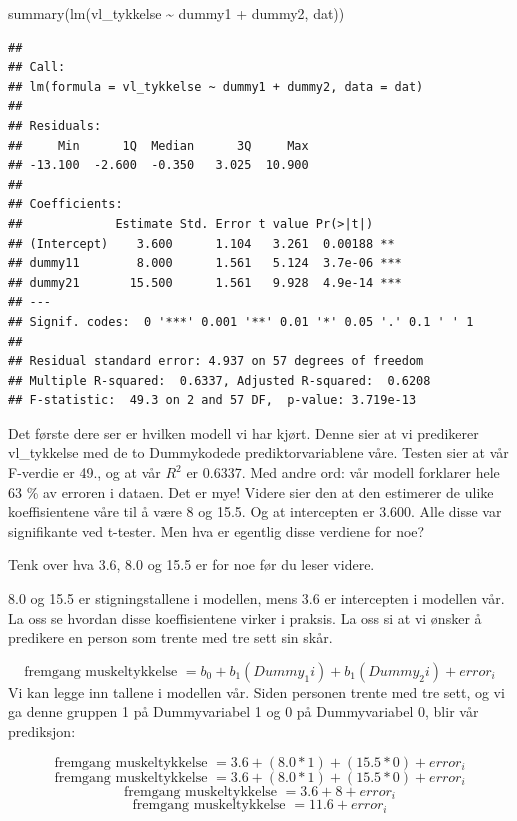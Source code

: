 \documentclass[
]{book}
\newenvironment{Shaded}{\begin{snugshade}}{\end{snugshade}}
\newcommand{\FunctionTok}[1]{\textcolor[rgb]{0.00,0.00,0.00}{#1}}
\newcommand{\NormalTok}[1]{#1}
\newcommand{\SpecialCharTok}[1]{\textcolor[rgb]{0.00,0.00,0.00}{#1}}
\begin{document}
\begin{Shaded}
\begin{Highlighting}[]
\FunctionTok{summary}\NormalTok{(}\FunctionTok{lm}\NormalTok{(vl\_tykkelse }\SpecialCharTok{\textasciitilde{}}\NormalTok{ dummy1 }\SpecialCharTok{+}\NormalTok{ dummy2, dat))}
\end{Highlighting}
\end{Shaded}

\begin{verbatim}
## 
## Call:
## lm(formula = vl_tykkelse ~ dummy1 + dummy2, data = dat)
## 
## Residuals:
##     Min      1Q  Median      3Q     Max 
## -13.100  -2.600  -0.350   3.025  10.900 
## 
## Coefficients:
##             Estimate Std. Error t value Pr(>|t|)    
## (Intercept)    3.600      1.104   3.261  0.00188 ** 
## dummy11        8.000      1.561   5.124  3.7e-06 ***
## dummy21       15.500      1.561   9.928  4.9e-14 ***
## ---
## Signif. codes:  0 '***' 0.001 '**' 0.01 '*' 0.05 '.' 0.1 ' ' 1
## 
## Residual standard error: 4.937 on 57 degrees of freedom
## Multiple R-squared:  0.6337, Adjusted R-squared:  0.6208 
## F-statistic:  49.3 on 2 and 57 DF,  p-value: 3.719e-13
\end{verbatim}

Det første dere ser er hvilken modell vi har kjørt. Denne sier at vi predikerer vl\_tykkelse med de to Dummykodede prediktorvariablene våre. Testen sier at vår F-verdie er 49., og at vår \(R^2\) er 0.6337. Med andre ord: vår modell forklarer hele 63 \% av erroren i dataen. Det er mye! Videre sier den at den estimerer de ulike koeffisientene våre til å være 8 og 15.5. Og at intercepten er 3.600. Alle disse var signifikante ved t-tester. Men hva er egentlig disse verdiene for noe?

Tenk over hva 3.6, 8.0 og 15.5 er for noe før du leser videre.

8.0 og 15.5 er stigningstallene i modellen, mens 3.6 er intercepten i modellen vår. La oss se hvordan disse koeffisientene virker i praksis. La oss si at vi ønsker å predikere en person som trente med tre sett sin skår.

\[
\text{fremgang muskeltykkelse } = b_0 + b_1(Dummy_1i) + b_1(Dummy_2i) + error_i
\]
Vi kan legge inn tallene i modellen vår. Siden personen trente med tre sett, og vi ga denne gruppen 1 på Dummyvariabel 1 og 0 på Dummyvariabel 0, blir vår prediksjon:

\[
\text{fremgang muskeltykkelse } = 3.6 + (8.0 * 1) + (15.5 * 0)  + error_i
\]
\[
\text{fremgang muskeltykkelse } = 3.6 + (8.0 * 1) + (15.5 * 0)  + error_i
\]
\[
\text{fremgang muskeltykkelse } = 3.6 + 8  + error_i
\]
\[
\text{fremgang muskeltykkelse } = 11.6  + error_i
\]
\end{document}
